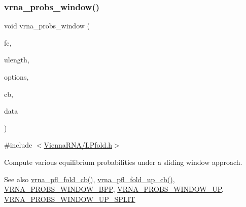 \subsubsection{\texorpdfstring{vrna\+\_\+probs\+\_\+window()}{vrna\_probs\_window()}}
{\footnotesize\ttfamily void vrna\+\_\+probs\+\_\+window (\begin{DoxyParamCaption}\item[{\hyperlink{group__fold__compound_ga1b0cef17fd40466cef5968eaeeff6166}{vrna\+\_\+fold\+\_\+compound\+\_\+t} $\ast$}]{fc,  }\item[{int}]{ulength,  }\item[{unsigned int}]{options,  }\item[{\hyperlink{LPfold_8h_abe710a1182e6db69cc75329dfc9bed67}{vrna\+\_\+probs\+\_\+window\+\_\+callback} $\ast$}]{cb,  }\item[{void $\ast$}]{data }\end{DoxyParamCaption})}



{\ttfamily \#include $<$\hyperlink{LPfold_8h}{Vienna\+R\+N\+A/\+L\+Pfold.\+h}$>$}



Compute various equilibrium probabilities under a sliding window approach. 

\begin{DoxySeeAlso}{See also}
\hyperlink{group__local__pf__fold_ga8dc3788e66420f524f2bfc0b685a939d}{vrna\+\_\+pfl\+\_\+fold\+\_\+cb()}, \hyperlink{group__local__pf__fold_ga8958d91b1f1aebfb32b58805d141ccf3}{vrna\+\_\+pfl\+\_\+fold\+\_\+up\+\_\+cb()}, \hyperlink{group__local__pf__fold_ga296217b76e76e5f7e6927e7210aa9b1f}{V\+R\+N\+A\+\_\+\+P\+R\+O\+B\+S\+\_\+\+W\+I\+N\+D\+O\+W\+\_\+\+B\+PP}, \hyperlink{group__local__pf__fold_ga18325811c7dfc7b7d9d4ac37f4353615}{V\+R\+N\+A\+\_\+\+P\+R\+O\+B\+S\+\_\+\+W\+I\+N\+D\+O\+W\+\_\+\+UP}, \hyperlink{group__local__pf__fold_ga9068f4ec008bf1c042a9357f5c2c5e13}{V\+R\+N\+A\+\_\+\+P\+R\+O\+B\+S\+\_\+\+W\+I\+N\+D\+O\+W\+\_\+\+U\+P\+\_\+\+S\+P\+L\+IT}
\end{DoxySeeAlso}

